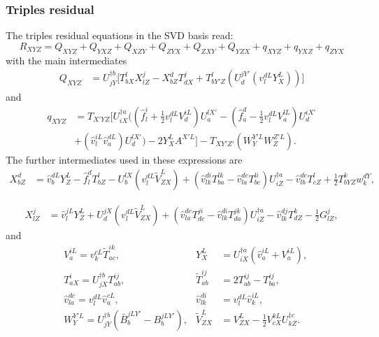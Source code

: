 \documentclass[a4paper,12pt,oneside]{book}
\newcommand{\half}{\frac{1}{2}}
\begin{document}
\subsubsection{Triples residual}

The triples residual equations in the SVD basis read:
\begin{equation}
  R_{XYZ} = Q_{XYZ} + Q_{YXZ} + Q_{XZY} + Q_{ZYX} + Q_{ZXY} + Q_{YZX}
   + q_{XYZ} + q_{YXZ} + q_{ZYX}
\end{equation}
with the main intermediates
\begin{equation}
\begin{aligned}
  Q_{XYZ} &= U^{\dagger b}_{jY} \Big[T_{bX}^l X_{lZ}^j - X_{bZ}^d T_{dX}^j 
  +T_{bY'Z}^{l} \left(U_d^{jY'}  \left(v_l^{dL} Y_X^L \right)\right)\Big]
\end{aligned}
\end{equation}
and
\begin{equation}
\begin{aligned}
  q_{XYZ} &= T_{X'YZ} \Big[U^{\dagger a}_{iX} \Big( \left(\hat{f}_l^i + \half v_l^{dL} V_d^{iL}\right)U_a^{lX'}
  - \left(\hat{f}_a^d - \half v_l^{dL} V_{a}^{lL}\right) U_d^{iX'}\\
 & + \left(\hat{v}_l^{iL} \hat{v}_a^{dL}\right) U_d^{lX'}\Big)
 -2 Y_X^L A^{X'L}\Big]
  - T_{XY'Z'} \left( W_Y^{Y'L} W_Z^{Z'L}\right).
\end{aligned}
\end{equation}
The further intermediates used in these expressions are 
\begin{equation}
\begin{aligned}
X_{bZ}^d &= \hat{v}_b^{dL} Y_Z^L - \hat{f}_l^d T_{bZ}^l 
 - U^{lX}_{b} \left(v_l^{dL} \tilde V_{ZX}^{L}\right)
 + \left(\hat v_{lk}^{di} T^{lk}_{ba} - \hat v_{la}^{dc} T^{li}_{bc}\right) U^{\dagger a}_{iZ}
- \hat v_{lb}^{dc} T_{cZ}^l 
 + \half T_{bYZ}^{k} w_k^{dY},
\end{aligned}
\end{equation}

\begin{equation}
\begin{aligned}
X_{lZ}^j&= \hat{v}_l^{jL} Y_Z^L
 + U^{jX}_{d} \left(v_l^{dL} \tilde V_{ZX}^{L}\right) 
 + \left(\hat v_{la}^{dc} T^{ji}_{dc} - \hat v_{lk}^{di} T^{jk}_{da}\right) U^{\dagger a}_{iZ}
  - \hat v_{lk}^{dj} T^k_{dZ}
  - \half G_{lZ}^{j},
\end{aligned}
\end{equation}
and
\begin{equation}
\begin{aligned}
  &V_a^{iL} = v_k^{cL}  \widetilde{T}_{ac}^{ik}, &
  Y_X^L &= U^{\dagger a}_{iX} \left(\hat{v}_a^{iL} + V_a^{iL} \right),\\
&T_{aX}^i = U^{\dagger b}_{jX}  T_{ab}^{ij}, &
\widetilde{T}_{ab}^{ij} &= 2  T_{ab}^{ij} - T_{ba}^{ij},\\
&\hat v_{la}^{dc} = v_l^{dL} \hat v_a^{cL}, &
\hat v_{lk}^{di} &= v_l^{dL} \hat v_k^{iL},\\
&W_{Y}^{Y'L} =  U^{\dagger b}_{jY}  \left(\bar B_b^{jLY'} - B_b^{jLY'}\right), &
\tilde V_{ZX}^{L} &= V_{ZX}^{L} - \half V_{cX}^{kL} U^{\dagger c}_{kZ}.
\end{aligned}
\end{equation}
\end{document}
